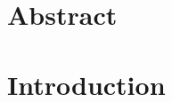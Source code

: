 \documentclass[a4paper,10pt]{article}
\begin{document}
		\vspace{1cm}
	
	\begin{multicols}{2}
		\tableofcontents
	\end{multicols}
	
		\vspace{1cm}
	
		\section{Abstract}
		
	\twocolumn

	\section{Introduction}
\end{document}
